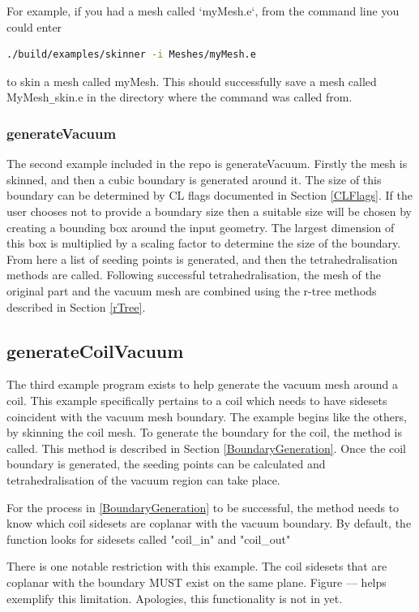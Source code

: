\documentclass[12pt, letterpaper]{article}
\begin{document}
For example, if you had a mesh called `myMesh.e`, from the command line you could enter 
\begin{lstlisting}[language=bash]
	./build/examples/skinner -i Meshes/myMesh.e
\end{lstlisting}
to skin a mesh called myMesh. This should successfully save a mesh called MyMesh\verb|_|skin.e in the directory where the command was called from. 

\subsubsection{generateVacuum}
The second example included in the repo is generateVacuum. Firstly the mesh is skinned, and then a cubic boundary is generated around it. The size of this boundary can be determined by CL flags documented in Section \ref{CLFlags}. If the user chooses not to provide a boundary size then a suitable size will be chosen by creating a bounding box around the input geometry. The largest dimension of this box is multiplied by a scaling factor to determine the size of the boundary. From here a list of seeding points is generated, and then the tetrahedralisation methods are called. Following successful tetrahedralisation, the mesh of the original part and the vacuum mesh are combined using the r-tree methods described in Section \ref{rTree}.

\subsection{generateCoilVacuum}
The third example program exists to help generate the vacuum mesh around a coil. This example specifically pertains to a coil which needs to have sidesets coincident with the vacuum mesh boundary. The example begins like the others, by skinning the coil mesh. To generate the boundary for the coil, the  method is called. This method is described in Section \ref{BoundaryGeneration}. Once the coil boundary is generated, the seeding points can be calculated and tetrahedralisation of the vacuum region can take place. 

For the process in \ref{BoundaryGeneration} to be successful, the  method needs to know which coil sidesets are coplanar with the vacuum boundary. By default, the function looks for sidesets called "coil\_in" and "coil\_out"

There is one notable restriction with this example. The coil sidesets that are coplanar with the boundary MUST exist on the same plane. Figure --- helps exemplify this limitation. Apologies, this functionality is not in yet.
\end{document}
